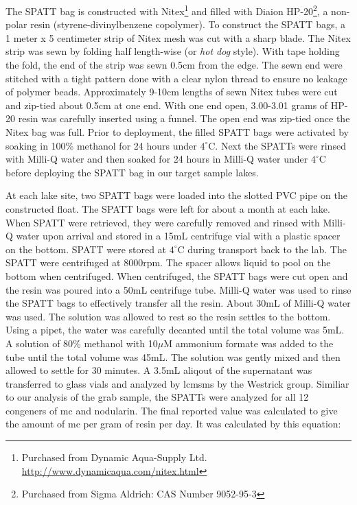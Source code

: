 The SPATT bag is constructed with Nitex\footnote{Purchased from Dynamic Aqua-Supply Ltd.  \url{http://www.dynamicaqua.com/nitex.html}} and filled with Diaion\texttrademark \: HP-20\footnote{Purchased from Sigma Aldrich: CAS Number 9052-95-3}, a non-polar resin (styrene-divinylbenzene copolymer). To construct the SPATT bags, a 1 meter x 5 centimeter strip of Nitex mesh was cut with a sharp blade. The Nitex strip was sewn by folding half length-wise (or \emph{hot dog} style). With tape holding the fold, the end of the strip was sewn 0.5cm from the edge. The sewn end were stitched with a tight pattern done with a clear nylon thread to ensure no leakage of polymer beads. Approximately 9-10cm lengths of sewn Nitex tubes were cut and zip-tied about 0.5cm at one end. With one end open, 3.00-3.01 grams of HP-20 resin was carefully inserted using a funnel. The open end was zip-tied once the Nitex bag was full. Prior to deployment, the filled SPATT bags were activated by soaking in 100\% methanol for 24 hours under $4^\circ$C. Next the SPATTs were rinsed with Milli-Q water and then soaked for 24 hours in Milli-Q water under $4^\circ$C before deploying the SPATT bag in our target sample lakes.

At each lake site, two SPATT bags were loaded into the slotted PVC pipe on the constructed float. The SPATT bags were left for about a month at each lake. When SPATT were retrieved, they were carefully removed and rinsed with Milli-Q water upon arrival and stored in a 15mL centrifuge vial with a plastic spacer on the bottom. SPATT were stored at $4^\circ$C during transport back to the lab. The SPATT were centrifuged at 8000rpm. The spacer allows liquid to pool on the bottom when centrifuged. When centrifuged, the SPATT bags were cut open and the resin was poured into a 50mL centrifuge tube. Milli-Q water was used to rinse the SPATT bags to effectively transfer all the resin. About 30mL of Milli-Q water was used. The solution was allowed to rest so the resin settles to the bottom. Using a pipet, the water was carefully decanted until the total volume was 5mL.  A solution of 80\% methanol with 10$\mu$M ammonium formate was added to the tube until the total volume was 45mL. The solution was gently mixed and then allowed to settle for 30 minutes. A 3.5mL aliqout of the supernatant was transferred to glass vials and analyzed by \gls{lcmsms} by the Westrick group. Similiar to our analysis of the grab sample, the SPATTs were analyzed for all 12 congeners of \gls{mc} and nodularin. The final reported value was calculated to give the amount of \gls{mc} per gram of resin per day. It was calculated by this equation:

